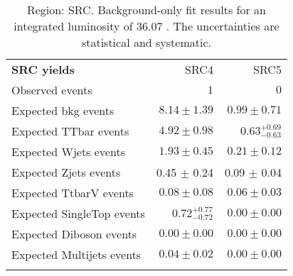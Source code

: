 

\begin{table}
\begin{center}
\setlength{\tabcolsep}{0.0pc}
{\small
\begin{tabular*}{\textwidth}{@{\extracolsep{\fill}}lrr}
\noalign{\smallskip}\hline\noalign{\smallskip}
{\bf SRC yields}           & SRC4            & SRC5              \\[-0.05cm]
\noalign{\smallskip}\hline\noalign{\smallskip}
Observed events          & $1$              & $0$                    \\
\noalign{\smallskip}\hline\noalign{\smallskip}
Expected bkg events         & $8.14 \pm 1.39$          & $0.99 \pm 0.71$              \\
\noalign{\smallskip}\hline\noalign{\smallskip}
        Expected TTbar events         & $4.92 \pm 0.98$          & $0.63_{-0.63}^{+0.69}$              \\
        Expected Wjets events         & $1.93 \pm 0.45$          & $0.21 \pm 0.12$              \\
        Expected Zjets events         & 0.45 $\pm$ 0.24          & 0.09 $\pm$ 0.04             \\
        Expected TtbarV events         & $0.08 \pm 0.08$          & $0.06 \pm 0.03$              \\
        Expected SingleTop events         & $0.72_{-0.72}^{+0.77}$          & $0.00 \pm 0.00$              \\
        Expected Diboson events         & $0.00 \pm 0.00$          & $0.00 \pm 0.00$              \\
        Expected Multijets events         & $0.04 \pm 0.02$          & $0.00 \pm 0.00$              \\
 \noalign{\smallskip}\hline\noalign{\smallskip}
\end{tabular*}
}
\end{center}
\caption{Region: SRC. Background-only fit results for an integrated luminosity of 36.07 \ifb. The uncertainties are statistical and systematic.
}
\label{table.bkgonly.SRC4to5}
\end{table}
%
